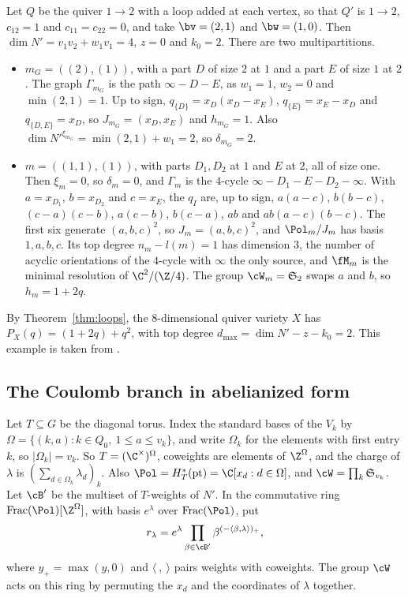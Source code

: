 \documentclass[11pt]{amsart}
\begin{document}
\begin{example}\label{ex:A2loops}
Let $Q$ be the quiver $1\to2$ with a loop added at each vertex, so that $Q'$
is $1\to2$, $c_{12}=1$ and $c_{11}=c_{22}=0$, and take $\bv=(2,1)$ and
$\bw=(1,0)$.  Then $\dim N'=v_1v_2+w_1v_1=4$, $z=0$ and $k_0=2$.  There are
two multipartitions.
\begin{itemize}[leftmargin=2em]
\item $m_G=((2),(1))$, with a part $D$ of size $2$ at $1$ and a part $E$ of
size $1$ at $2$.  The graph $\Gamma_{m_G}$ is the path $\infty-D-E$, as
$w_1=1$, $w_2=0$ and $\min(2,1)=1$.  Up to sign, $q_{\{D\}}=x_D(x_D-x_E)$,
$q_{\{E\}}=x_E-x_D$ and $q_{\{D,E\}}=x_D$, so $J_{m_G}=(x_D,x_E)$ and
$h_{m_G}=1$.  Also $\dim N'^{\xi_{m_G}}=\min(2,1)+w_1=2$, so $\delta_{m_G}=2$.
\item $m=((1,1),(1))$, with parts $D_1,D_2$ at $1$ and $E$ at $2$, all of size
one.  Then $\xi_m=0$, so $\delta_m=0$, and $\Gamma_m$ is the $4$-cycle
$\infty-D_1-E-D_2-\infty$.  With $a=x_{D_1}$, $b=x_{D_2}$ and $c=x_E$, the
$q_I$ are, up to sign, $a(a-c)$, $b(b-c)$, $(c-a)(c-b)$, $a(c-b)$, $b(c-a)$,
$ab$ and $ab(a-c)(b-c)$.  The first six generate $(a,b,c)^2$, so
$J_m=(a,b,c)^2$, and $\Pol_m/J_m$ has basis $1,a,b,c$.  Its top degree
$n_m-l(m)=1$ has dimension $3$, the number of acyclic orientations of the
$4$-cycle with $\infty$ the only source, and $\fM_m$ is the minimal resolution
of $\C^2/(\Z/4)$.  The group $\cW_m=\mathfrak S_2$ swaps $a$ and $b$, so
$h_m=1+2q$.
\end{itemize}
By Theorem~\ref{thm:loops}, the $8$-dimensional quiver variety $X$ has
$P_X(q)=(1+2q)+q^2$, with top degree $d_{\max}=\dim N'-z-k_0=2$.  This example is taken from
\cite[Exs.~1.13, 3.8]{nakajimaMultipartitionSpaces2026}.
\end{example}

\subsection{The Coulomb branch in abelianized form}\label{ss:abel}
Let $T\subseteq G$ be the diagonal torus.  Index the standard bases of the
$V_k$ by $\Omega=\{(k,a):k\in Q_0,\ 1\le a\le v_k\}$, and write $\Omega_k$ for
the elements with first entry $k$, so $|\Omega_k|=v_k$.  So
$T=(\C^\times)^\Omega$, coweights are elements of $\Z^\Omega$, and the
charge of $\lambda$ is $(\sum_{d\in\Omega_k}\lambda_d)_k$.  Also
$\Pol=H^*_T(\mathrm{pt})=\C[x_d:d\in\Omega]$, and $\cW=\prod_k\mathfrak S_{v_k}$.  Let
$\cB'$ be the multiset of $T$-weights of $N'$.  In the commutative ring
$\mathrm{Frac}(\Pol)[\Z^\Omega]$, with basis $e^\lambda$ over
$\mathrm{Frac}(\Pol)$, put
\[
 r_\lambda=e^\lambda\prod_{\beta\in\cB'}\beta^{(-\langle\beta,\lambda\rangle)_+},
\]
where $y_+=\max(y,0)$ and $\langle\ ,\ \rangle$ pairs weights with coweights.
The group $\cW$ acts on this ring by permuting the $x_d$ and the coordinates
of $\lambda$ together.
\end{document}
